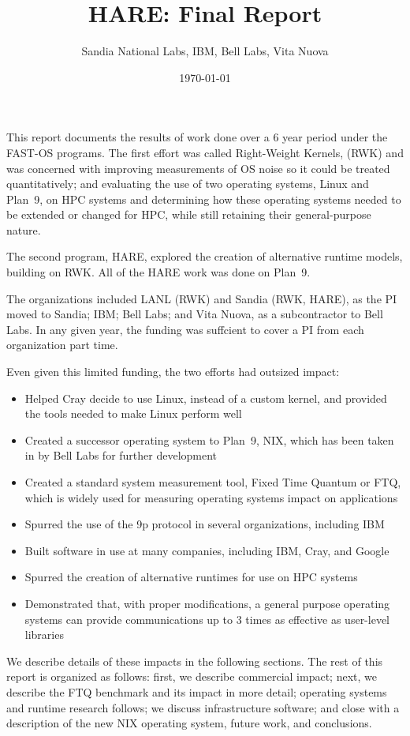 \documentclass{report}
\title{HARE: Final Report}
\author{Sandia National Labs, IBM, Bell Labs, Vita Nuova}
\date{\today}
\begin{document}
\maketitle
\tableofcontents
\pagebreak

This report documents the results of work done over a 6 year period under the FAST-OS 
programs. The first effort was called Right-Weight Kernels, (RWK) and was concerned with 
improving measurements of OS noise so it could be treated quantitatively; 
and evaluating the use of two operating systems, Linux
and Plan~9, on HPC systems and determining how these operating systems needed
to be extended or changed for HPC, while still retaining their general-purpose nature. 

The second program, HARE, explored the creation of alternative runtime models, 
building on RWK. All of the HARE work was done on Plan~9. 

The organizations included LANL (RWK) and Sandia (RWK, HARE), as the PI moved to Sandia; 
IBM; Bell Labs; and Vita Nuova, as a subcontractor to Bell Labs. In any given year, 
the funding was suffcient to cover a PI from each organization part time. 

Even given this limited funding, the two efforts had outsized impact: 
\begin{itemize}
\item Helped Cray decide to use Linux, instead of a custom kernel, and provided
the tools needed to make Linux perform well
\item Created a successor operating system to Plan~9, NIX, which has been taken in 
by Bell Labs for further development
\item Created a standard system measurement tool, Fixed Time Quantum or FTQ, which is widely
used for measuring operating systems impact on applications
\item Spurred the use of the 9p protocol in several organizations, including IBM
\item Built software in use at many companies, including IBM, Cray, and Google
\item Spurred the creation of alternative runtimes for use on HPC systems
\item Demonstrated that, with proper modifications, a general purpose operating systems
can provide communications up to 3 times as effective as user-level libraries
\end{itemize}

We describe details of these impacts in the following sections. The rest of this 
report is organized as follows: first, we describe commercial impact; next, 
we describe the FTQ benchmark and its impact in more detail; operating systems
and runtime research follows; we discuss infrastructure software; and close with a 
description of the new NIX  operating system, future work, and conclusions. 





\end{document}
